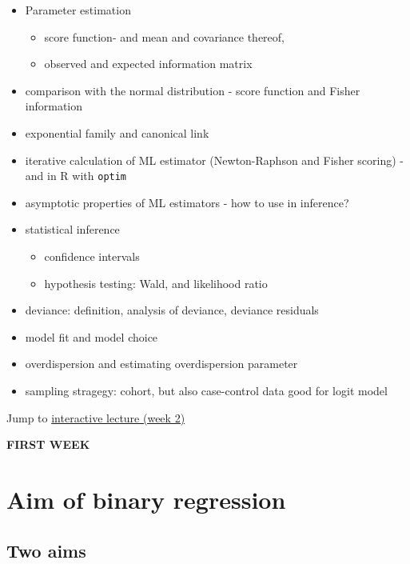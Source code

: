 \documentclass[
]{article}
\providecommand{\tightlist}{%
  \setlength{\itemsep}{0pt}\setlength{\parskip}{0pt}}
\begin{document}
\begin{itemize}
\tightlist
\item
  Parameter estimation

  \begin{itemize}
  \tightlist
  \item
    score function- and mean and covariance thereof,
  \item
    observed and expected information matrix
  \end{itemize}
\item
  comparison with the normal distribution - score function and Fisher
  information
\item
  exponential family and canonical link
\item
  iterative calculation of ML estimator (Newton-Raphson and Fisher
  scoring) - and in R with \texttt{optim}
\item
  asymptotic properties of ML estimators - how to use in inference?
\item
  statistical inference

  \begin{itemize}
  \tightlist
  \item
    confidence intervals
  \item
    hypothesis testing: Wald, and likelihood ratio
  \end{itemize}
\item
  deviance: definition, analysis of deviance, deviance residuals
\item
  model fit and model choice
\item
  overdispersion and estimating overdispersion parameter
\item
  sampling stragegy: cohort, but also case-control data good for logit
  model
\end{itemize}

Jump to \protect\hyperlink{ILw2}{interactive lecture (week 2)}

\textbf{FIRST WEEK}

\hypertarget{aim-of-binary-regression}{%
\section{Aim of binary regression}\label{aim-of-binary-regression}}

\hypertarget{two-aims}{%
\subsection{Two aims}\label{two-aims}}
\end{document}

